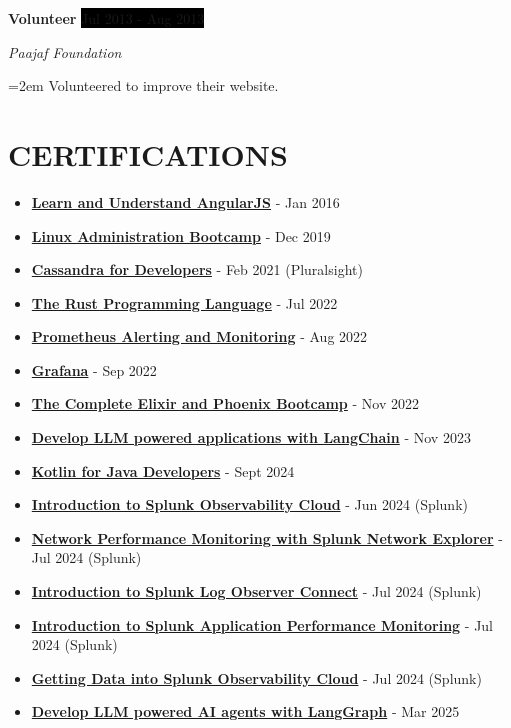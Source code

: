 \documentclass[paper=a4,fontsize=11pt]{scrartcl} %
\newcommand{\NewPart}[1]{\section*{\uppercase{#1}}}
\newcommand{\EducationEntry}[4]{
		\noindent \textbf{#1} \hfill      %
		\colorbox{Black}{%
			\parbox{6em}{%
			\hfill\color{White}#2}} \par  %
		\noindent \textit{#3} \par        %
		\noindent\hangindent=2em\hangafter=0 \small #4 %
		\normalsize \par}
\newcommand{\WorkEntry}[4]{				  %
		\noindent \textbf{#1} \hfill      %
		\colorbox{Black}{\color{White}#2} \par  %
		\noindent \textit{#3} \par              %
		\noindent\hangindent=2em\hangafter=0 \small #4 %
		\normalsize \par}
\begin{document}
\WorkEntry{Volunteer}{Jul 2013 - Aug 2013}{Paajaf Foundation}{Volunteered to improve their website.}


\NewPart{Certifications}{}

\begin{itemize}
\item \textbf{\href{https://www.udemy.com/certificate/UC-3KQ4IOU8/}{Learn and Understand AngularJS}} - Jan 2016
\item \textbf{\href{https://www.udemy.com/certificate/UC-TPZXFYXZ/}{Linux Administration Bootcamp}} - Dec 2019
\item \textbf{\href{https://drive.google.com/file/d/1w4emc7PHAq5YQt70xippnAuZmQSZx7tR/view}{Cassandra for Developers}} - Feb 2021 (Pluralsight)
\item \textbf{\href{https://www.udemy.com/certificate/UC-21307ab6-9d1b-4119-a546-c95f931bf92f/}{The Rust Programming Language}} - Jul 2022
\item \textbf{\href{https://www.udemy.com/certificate/UC-3c8beedc-a946-4a96-8f72-a871e98ba025/}{Prometheus Alerting and Monitoring}} - Aug 2022
\item \textbf{\href{https://www.udemy.com/certificate/UC-15d5186d-6069-48d0-adb2-7e3d54a7c5ad/}{Grafana}} - Sep 2022
\item \textbf{\href{https://www.udemy.com/certificate/UC-fc7a4b3b-14f7-448a-93fc-c795bcc3dc05/}{The Complete Elixir and Phoenix Bootcamp}} - Nov 2022
\item \textbf{\href{https://www.udemy.com/certificate/UC-6e2f024d-1716-4252-94ae-e4ed6b375ceb/}{Develop LLM powered applications with LangChain}} - Nov 2023
\item \textbf{\href{https://www.udemy.com/certificate/UC-8780645d-99db-4604-a437-f24afa34a3eb/}{Kotlin for Java Developers}} - Sept 2024
\item \textbf{\href{https://www.splunk.com/}{Introduction to Splunk Observability Cloud}} - Jun 2024 (Splunk)
\item \textbf{\href{https://www.splunk.com/}{Network Performance Monitoring with Splunk Network Explorer}} - Jul 2024 (Splunk)
\item \textbf{\href{https://www.splunk.com/}{Introduction to Splunk Log Observer Connect}} - Jul 2024 (Splunk)
\item \textbf{\href{https://www.splunk.com/}{Introduction to Splunk Application Performance Monitoring}} - Jul 2024 (Splunk)
\item \textbf{\href{https://www.splunk.com/}{Getting Data into Splunk Observability Cloud}} - Jul 2024 (Splunk)
\item \textbf{\href{https://www.udemy.com/certificate/UC-df02e75c-5a40-48f9-ad82-11be237f55cf/}{Develop LLM powered AI agents with LangGraph}} - Mar 2025
\end{itemize}
\end{document}
